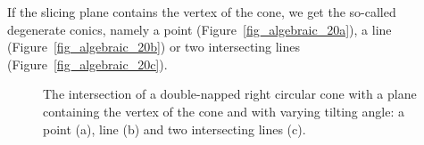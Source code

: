 If the slicing plane contains the vertex of the cone, we get the so-called degenerate conics, namely a point (Figure~\ref{fig_algebraic_20a}), a line (Figure~\ref{fig_algebraic_20b}) or two intersecting lines (Figure~\ref{fig_algebraic_20c}). 

\begin{figure}[h]
\centering
\centerline{
\hspace{0.1cm}
}
\centerline{
}
\caption{The intersection of a double-napped right circular cone with a plane containing the vertex of the cone and with varying tilting angle: a point (a), line (b) and two intersecting lines (c). }
\end{figure}

